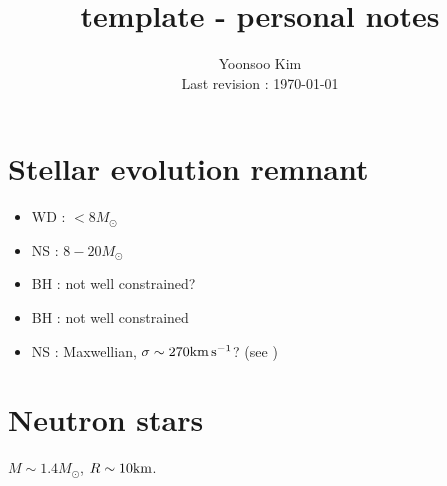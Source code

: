 \documentclass[11pt, oneside]{article}
\title{
    {\bfseries template - personal notes}
}
\author{
    Yoonsoo Kim
    \\[1em]
    Last revision : \today
    \vspace{-5em}
}
\date{}
\newcommand{\solarmass}{M_\odot}
\begin{document}
\maketitle

\setcounter{tocdepth}{2}
\tableofcontents

\newpage

% 
% 
\section{Stellar evolution remnant}


\begin{description}[style=multiline, leftmargin=8em,
    labelindent=0em, font=\textbf]
\item[Mass prescriptions] \begin{itemize}
    \item WD : $<8\solarmass$
    \item NS : $8-20\solarmass$
    \item BH : not well constrained?
\end{itemize}
\end{description}


\begin{description}[style=multiline, leftmargin=8em,
    labelindent=0em, font=\textbf]
\item[Natal kicks] \begin{itemize}
     \item BH : not well constrained
     \item NS : Maxwellian, $\sigma \sim 270\si[]{\kilo\meter\per\second}$?
     (see \cite{Hobbs2005})
\end{itemize}
\end{description}


% 
% 
\section{Neutron stars}

$M\sim 1.4\solarmass$, $R\sim 10\si[]{\km}$.
\end{document}
